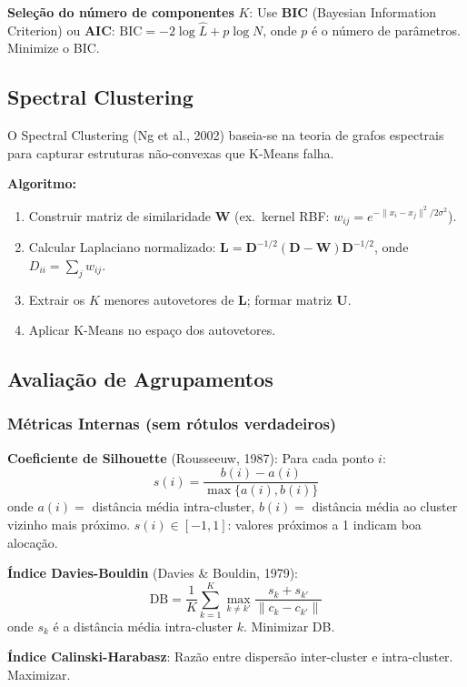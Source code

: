 \documentclass[12pt,a4paper]{article}
\begin{document}
\textbf{Seleção do número de componentes} $K$: Use \textbf{BIC} (Bayesian Information Criterion) ou \textbf{AIC}: $\text{BIC} = -2\log\hat{L} + p \log N$, onde $p$ é o número de parâmetros. Minimize o BIC.

\subsection{Spectral Clustering}

O Spectral Clustering (Ng et al., 2002) baseia-se na teoria de grafos espectrais para capturar estruturas não-convexas que K-Means falha.

\textbf{Algoritmo:}
\begin{enumerate}
  \item Construir matriz de similaridade $\mathbf{W}$ (ex.\ kernel RBF: $w_{ij} = e^{-\|x_i-x_j\|^2/2\sigma^2}$).
  \item Calcular Laplaciano normalizado: $\mathbf{L} = \mathbf{D}^{-1/2}(\mathbf{D}-\mathbf{W})\mathbf{D}^{-1/2}$, onde $D_{ii} = \sum_j w_{ij}$.
  \item Extrair os $K$ menores autovetores de $\mathbf{L}$; formar matriz $\mathbf{U}$.
  \item Aplicar K-Means no espaço dos autovetores.
\end{enumerate}

\subsection{Avaliação de Agrupamentos}

\subsubsection{Métricas Internas (sem rótulos verdadeiros)}

\textbf{Coeficiente de Silhouette} (Rousseeuw, 1987): Para cada ponto $i$:
\[
  s(i) = \frac{b(i) - a(i)}{\max\{a(i), b(i)\}}
\]
onde $a(i) = $ distância média intra-cluster, $b(i) = $ distância média ao cluster vizinho mais próximo.
$s(i) \in [-1, 1]$: valores próximos a 1 indicam boa alocação.

\textbf{Índice Davies-Bouldin} (Davies \& Bouldin, 1979):
\[
  \text{DB} = \frac{1}{K} \sum_{k=1}^{K} \max_{k \neq k'} \frac{s_k + s_{k'}}{\|c_k - c_{k'}\|}
\]
onde $s_k$ é a distância média intra-cluster $k$. Minimizar DB.

\textbf{Índice Calinski-Harabasz}: Razão entre dispersão inter-cluster e intra-cluster. Maximizar.
\end{document}
